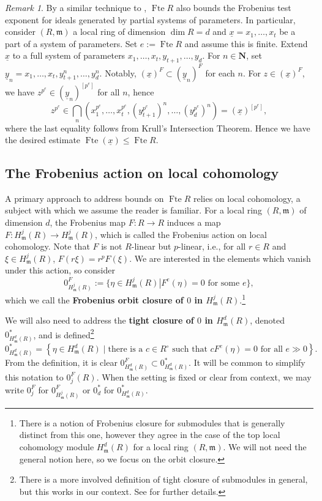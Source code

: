 \documentclass{amsproc}
\theoremstyle{definition}
\theoremstyle{remark}
\newtheorem{remark}[theorem]{Remark}
\numberwithin{equation}{section}
\newcommand{\NN}{\mathbf{N}}
\newcommand{\fm}{\mathfrak{m}}
\newcommand{\fbp}[1]{\left[ #1 \right]}
\newcommand{\fte}{\operatorname{Fte}}
\begin{document}
\begin{remark}\label{rmk: full fte bounds partial fte}
By a similar technique to \cite[Lem. 3.1]{Ma15}, $\fte R$ also bounds the Frobenius test exponent for ideals generated by partial systems of parameters. In particular, consider $(R,\fm)$ a local ring of dimension $\dim R = d$ and $\underline{x}=x_1,\ldots,x_t$ be a part of a system of parameters. Set $e := \fte R$ and assume this is finite. Extend $\underline{x}$ to a full system of parameters $x_1,\ldots,x_t,y_{t+1},\ldots,y_d$. For $n \in \NN$, set $\underline{y}_n = x_1,\ldots,x_t,y_{t+1}^n,\ldots,y_d^n$. Notably, $(\underline{x})^F\subset (\underline{y}_n)^F$ for each $n$. For $z \in (\underline{x})^F$, we have $z^{p^e} \in (\underline{y}_n)^{\fbp{p^e}}$ for all $n$, hence \[z^{p^e} \in \bigcap_n \left(x_1^{p^e},\ldots,x_t^{p^e},\left(y_{t+1}^{p^e}\right)^n,\ldots,\left(y_d^{p^e}\right)^n\right) = (\underline{x})^{\fbp{p^e}},\] where the last equality follows from Krull's Intersection Theorem. Hence we have the desired estimate $\fte (\underline{x}) \le \fte R$.
\end{remark}

\subsection{The Frobenius action on local cohomology}\label{subsec: frob action} A primary approach to address bounds on $\fte R$ relies on local cohomology, a subject with which we assume the reader is familiar. For a local ring $(R,\fm)$ of dimension $d$, the Frobenius map $F:R\rightarrow R$ induces a map $F : H^j_\fm(R) \rightarrow H^j_\fm(R)$, which is called the Frobenius action on local cohomology. Note that $F$ is not $R$-linear but $p$-linear, i.e., for all $r \in R$ and $\xi \in H^j_\fm(R)$, $F(r\xi)=r^pF(\xi)$. We are interested in the elements which vanish under this action, so consider \[0^F_{H^j_\fm(R)} := \{ \eta \in H^j_\fm(R) \left| F^e(\eta) = 0 \textrm{ for some } e \right. \},\] which we call the \textbf{Frobenius orbit closure of $0$ in $H^j_\fm(R)$}.\footnote{There is a notion of Frobenius closure for submodules that is generally distinct from this one, however they agree in the case of the top local cohomology module $H^d_\fm(R)$ for a local ring $(R,\fm)$. We will not need the general notion here, so we focus on the orbit closure.} 

We will also need to address the \textbf{tight closure of $0$ in $H^d_\fm(R)$}, denoted $0^*_{H^d_\fm(R)}$, and is defined\footnote{There is a more involved definition of tight closure of submodules in general, but this works in our context. See \cite[Rmk. 2.6]{PQ19} for further details.} \[
0^*_{H^d_\fm(R)} = \left\lbrace \eta \in H^d_\fm(R) \mid \textrm{there is a } c \in R^\circ \textrm{ such that } cF^e(\eta) = 0 \textrm { for all } e \gg 0 \right\rbrace.
\] From the definition, it is clear $0^F_{H^d_\fm(R)} \subset 0^*_{H^d_\fm(R)}.$ It will be common to simplify this notation to $0^F_j(R)$. When the setting is fixed or clear from context, we may write $0_j^F$ for $0^F_{H^j_\fm(R)}$ or $0^*_d$ for $0^*_{H^d_\fm(R)}$.
\end{document}
